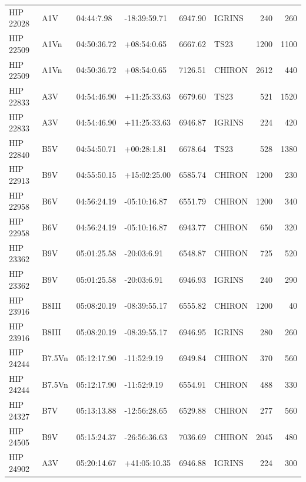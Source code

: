 \documentclass{emulateapj}
\begin{document}
\begin{longtable*}{|l|lllrlrr|}
   HIP 22028 &            A1V &     04:44:7.98 &   -18:39:59.71 &  6947.90 &     IGRINS &      240 &     260 \\
   HIP 22509 &           A1Vn &    04:50:36.72 &    +08:54:0.65 &  6667.62 &       TS23 &     1200 &    1100 \\
   HIP 22509 &           A1Vn &    04:50:36.72 &    +08:54:0.65 &  7126.51 &     CHIRON &     2612 &     440 \\
   HIP 22833 &            A3V &    04:54:46.90 &   +11:25:33.63 &  6679.60 &       TS23 &      521 &    1520 \\
   HIP 22833 &            A3V &    04:54:46.90 &   +11:25:33.63 &  6946.87 &     IGRINS &      224 &     420 \\
   HIP 22840 &            B5V &    04:54:50.71 &    +00:28:1.81 &  6678.64 &       TS23 &      528 &    1380 \\
   HIP 22913 &            B9V &    04:55:50.15 &   +15:02:25.00 &  6585.74 &     CHIRON &     1200 &     230 \\
   HIP 22958 &            B6V &    04:56:24.19 &   -05:10:16.87 &  6551.79 &     CHIRON &     1200 &     340 \\
   HIP 22958 &            B6V &    04:56:24.19 &   -05:10:16.87 &  6943.77 &     CHIRON &      650 &     320 \\
   HIP 23362 &            B9V &    05:01:25.58 &    -20:03:6.91 &  6548.87 &     CHIRON &      725 &     520 \\
   HIP 23362 &            B9V &    05:01:25.58 &    -20:03:6.91 &  6946.93 &     IGRINS &      240 &     290 \\
   HIP 23916 &          B8III &    05:08:20.19 &   -08:39:55.17 &  6555.82 &     CHIRON &     1200 &      40 \\
   HIP 23916 &          B8III &    05:08:20.19 &   -08:39:55.17 &  6946.95 &     IGRINS &      280 &     260 \\
   HIP 24244 &         B7.5Vn &    05:12:17.90 &    -11:52:9.19 &  6949.84 &     CHIRON &      370 &     560 \\
   HIP 24244 &         B7.5Vn &    05:12:17.90 &    -11:52:9.19 &  6554.91 &     CHIRON &      488 &     330 \\
   HIP 24327 &            B7V &    05:13:13.88 &   -12:56:28.65 &  6529.88 &     CHIRON &      277 &     560 \\
   HIP 24505 &            B9V &    05:15:24.37 &   -26:56:36.63 &  7036.69 &     CHIRON &     2045 &     480 \\
   HIP 24902 &            A3V &    05:20:14.67 &   +41:05:10.35 &  6946.88 &     IGRINS &      224 &     300 \\

\end{longtable*}
\end{document}
